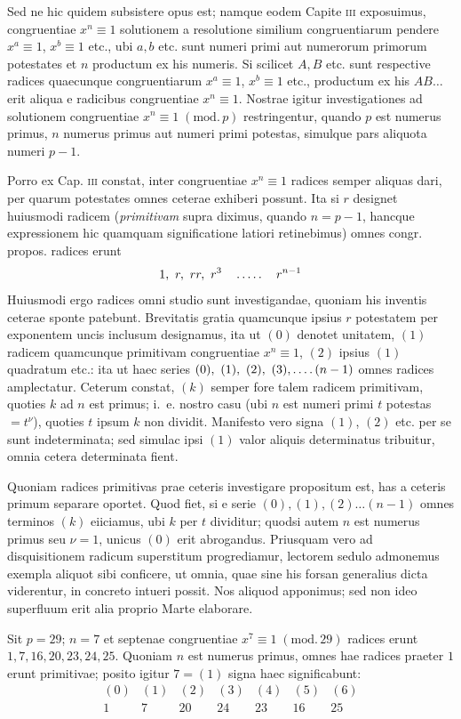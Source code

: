 Sed ne hic quidem subsistere opus est; namque eodem Capite \textsc{iii} exposuimus, congruentiae $x^n\equiv1$ solutionem a resolutione similium congruentiarum pendere $x^a\equiv1$, $x^b\equiv1$ etc., ubi $a,b$ etc. sunt numeri primi aut numerorum primorum potestates et $n$ productum ex his numeris. Si scilicet $A,B$ etc. sunt respective radices quaecunque congruentiarum $x^a\equiv1$, $x^b\equiv1$ etc., productum ex his $AB\ldots$ erit aliqua e radicibus congruentiae $x^n\equiv1$. Nostrae igitur investigationes ad solutionem congruentiae $x^n\equiv1\;(\mathrm{mod.}\,p)$ restringentur, quando $p$ est numerus primus, $n$ numerus primus aut numeri primi potestas, simulque pars aliquota numeri $p-1$.

%
Porro ex Cap. \textsc{iii} constat, inter congruentiae $x^n\equiv1$ radices semper aliquas dari, per quarum potestates omnes ceterae exhiberi possunt. Ita si $r$ designet huiusmodi radicem (\emph{primitivam} supra diximus, quando $n=p-1$, hancque expressionem hic quamquam significatione latiori retinebimus) omnes congr. propos. radices erunt
\[
1,\ r,\ rr,\ r^3\quad\dotsfive\quad r^{n-1}
\]
Huiusmodi ergo radices omni studio sunt investigandae, quoniam his inventis ceterae sponte patebunt. Brevitatis gratia quamcunque ipsius $r$ potestatem per exponentem uncis inclusum designamus, ita ut $(0)$ denotet unitatem, $(1)$ radicem quamcunque primitivam congruentiae $x^n\equiv1$, $(2)$ ipsius $(1)$ quadratum etc.: ita ut haec series $(0),\ (1),\ (2),\ (3),\dotsfour(n-1)$ omnes radices amplectatur. Ceterum constat, $(k)$ semper fore talem radicem primitivam, quoties $k$ ad $n$ est primus; i.~e. nostro casu (ubi $n$ est numeri primi $t$ potestas $=t^\nu$), quoties $t$ ipsum $k$ non dividit. Manifesto vero signa $(1)$, $(2)$ etc. per se sunt indeterminata; sed simulac ipsi $(1)$ valor aliquis determinatus tribuitur, omnia cetera determinata fient.

Quoniam radices primitivas prae ceteris investigare propositum est, has a ceteris primum separare oportet. Quod fiet, si e serie $(0),(1),(2)\ldots(n-1)$ omnes terminos $(k)$ eiiciamus, ubi $k$ per $t$ dividitur; quodsi autem $n$ est numerus primus seu $\nu=1$, unicus $(0)$ erit abrogandus. Priusquam vero ad disquisitionem radicum superstitum progrediamur, lectorem sedulo admonemus exempla aliquot sibi conficere, ut omnia, quae sine his forsan generalius dicta viderentur, in concreto intueri possit. Nos aliquod apponimus; sed non ideo superfluum erit alia proprio Marte elaborare.

Sit $p=29$; $n=7$ et septenae congruentiae $x^7\equiv1\;(\mathrm{mod.}\,29)$ radices erunt $1,7,16,20,23,24,25$. Quoniam $n$ est numerus primus, omnes hae radices praeter $1$ erunt primitivae; posito igitur $7=(1)$ signa haec significabunt:
\[
\begin{array}{ccccccc}
(0)&(1)&(2)&(3)&(4)&(5)&(6)\\
1&7&20&24&23&16&25
\end{array}
\]

